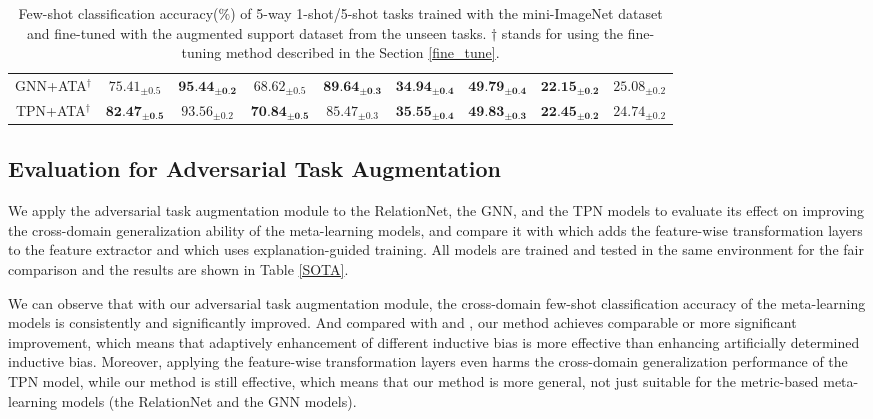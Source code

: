 \documentclass{article}
\begin{document}
\begin{table*}[ht]
\begin{tabular}{ccccccccc}
GNN+ATA$^{\dag}$         & $75.41_{\pm0.5}$ & $\textbf{95.44}_{\pm\textbf{0.2}}$ & $68.62_{\pm0.5}$ & $\textbf{89.64}_{\pm\textbf{0.3}}$ & $\textbf{34.94}_{\pm\textbf{0.4}}$ & $\textbf{49.79}_{\pm\textbf{0.4}}$ & $\textbf{22.15}_{\pm\textbf{0.2}}$ & $25.08_{\pm0.2}$ \\
TPN+ATA$^{\dag}$         & $\textbf{82.47}_{\pm\textbf{0.5}}$ & $93.56_{\pm0.2}$ & $\textbf{70.84}_{\pm\textbf{0.5}}$ & $85.47_{\pm0.3}$ & $\textbf{35.55}_{\pm\textbf{0.4}}$ & $\textbf{49.83}_{\pm\textbf{0.3}}$ & $\textbf{22.45}_{\pm\textbf{0.2}}$ & $24.74_{\pm0.2}$ \\
\bottomrule
\end{tabular}
\caption{Few-shot classification accuracy($\%$) of 5-way 1-shot/5-shot tasks trained with the mini-ImageNet dataset and fine-tuned with the augmented support dataset from the unseen tasks. $\dag$ stands for using the fine-tuning method described in the Section \ref{fine_tune}.}
\label{fine}
\end{table*}

\subsection{Evaluation for Adversarial Task Augmentation}
We apply the adversarial task augmentation module to the RelationNet, the GNN, and the TPN models to evaluate its effect on improving the cross-domain generalization ability of the meta-learning models, and compare it with \cite{DBLP:conf/iclr/TsengLH020} which adds the feature-wise transformation layers to the feature extractor and \cite{sun2020explanation} which uses explanation-guided training. All models are trained and tested in the same environment for the fair comparison and the results are shown in Table \ref{SOTA}.

We can observe that with our adversarial task augmentation module, the cross-domain few-shot classification accuracy of the meta-learning models is consistently and significantly improved. And compared with \cite{DBLP:conf/iclr/TsengLH020} and \cite{sun2020explanation}, our method achieves comparable or more significant improvement, which means that adaptively enhancement of different inductive bias is more effective than enhancing artificially determined inductive bias. Moreover, applying the feature-wise transformation layers even harms the cross-domain generalization performance of the TPN model, while our method is still effective, which means that our method is more general, not just suitable for the metric-based meta-learning models (the RelationNet and the GNN models).
\end{document}
